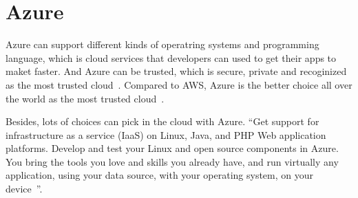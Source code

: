 \section{Azure}

Azure can support different kinds of operatring systems and programming language,
which is cloud services that developers can used to get their apps to maket faster.
And Azure can be trusted, which is secure, private and recoginized as the most trusted
cloud~\cite{www-azure}. Compared to AWS, Azure is the better choice all over the world
as the most trusted cloud~\cite{www-azure-opensource}. 

Besides, lots of choices can pick in the cloud with Azure. ``Get support for infrastructure
as a service (IaaS) on Linux, Java, and PHP Web application platforms. Develop and test 
your Linux and open source components in Azure. You bring the tools you love and skills 
you already have, and run virtually any application, using your data source, with your 
operating system, on your device~\cite{www-azure-choices}''.

